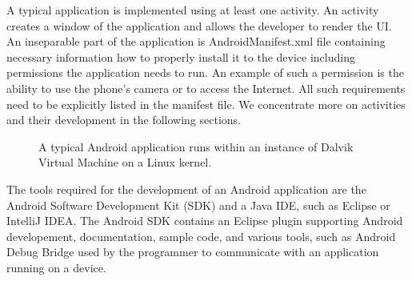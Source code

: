 A typical application is implemented using at least one activity. 
An activity creates a window of the application and allows the developer to render the UI.
An inseparable part of the application is AndroidManifest\@.xml file containing necessary information how to properly install it to the device 
including permissions the application needs to run. 
An example of such a permission is the ability to use the phone's camera or to access the Internet.
All such requirements need to be explicitly listed in the manifest file.
We concentrate more on activities and their development in the following sections.
\begin{figure}[h!]
    \caption{A typical Android application runs within an instance of Dalvik Virtual Machine on a Linux kernel.} %
\end{figure}

The tools required for the development of an Android application are the Android Software Development Kit (SDK) and a Java IDE, such as Eclipse or IntelliJ IDEA. 
The Android SDK contains an Eclipse plugin supporting Android developement, documentation, sample code, and various tools, such as Android Debug Bridge used by the programmer to communicate with an application running on a device. 


